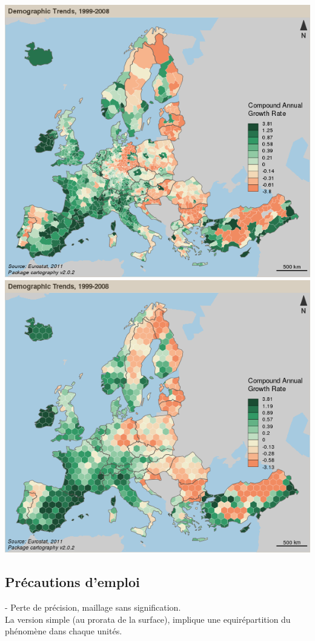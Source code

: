 \documentclass[]{book}
\begin{document}
\includegraphics[width=8.33in]{img/pregrid}
\includegraphics[width=8.33in]{img/grid}

\subsection{Précautions d'emploi}\label{precautions-demploi-3}

- Perte de précision, maillage sans signification.\\
La version simple (au prorata de la surface), implique une
equirépartition du phénomène dans chaque unités.
\end{document}
